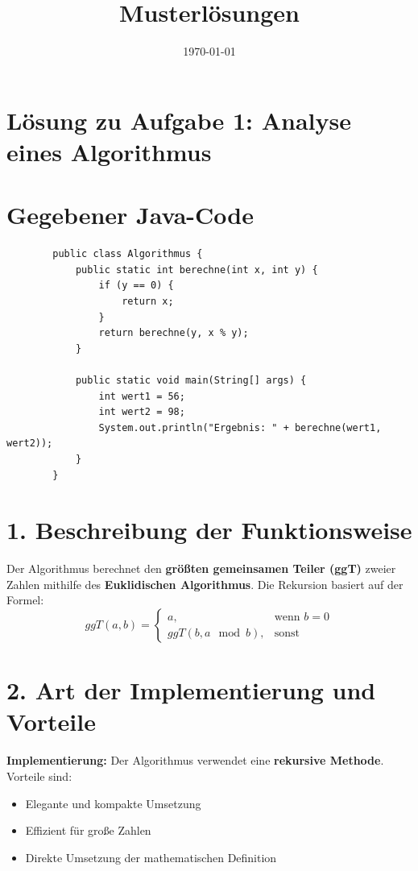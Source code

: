 \documentclass[a4paper,12pt]{article}
\begin{document}
	
	\title{\textbf{Musterlösungen}}
	\date{\today}
	\maketitle
	
	\section*{Lösung zu Aufgabe 1: Analyse eines Algorithmus}
	\section*{Gegebener Java-Code}
	
	\begin{verbatim}
		public class Algorithmus {
			public static int berechne(int x, int y) {
				if (y == 0) {
					return x;
				}
				return berechne(y, x % y);
			}
			
			public static void main(String[] args) {
				int wert1 = 56;
				int wert2 = 98;
				System.out.println("Ergebnis: " + berechne(wert1, wert2));
			}
		}
	\end{verbatim}
	
	\section*{1. Beschreibung der Funktionsweise}
	
	Der Algorithmus berechnet den \textbf{größten gemeinsamen Teiler (ggT)} zweier Zahlen mithilfe des \textbf{Euklidischen Algorithmus}. Die Rekursion basiert auf der Formel:
	\[ ggT(a, b) = \begin{cases} a, & \text{wenn } b = 0 \\ ggT(b, a\mod b), & \text{sonst} \end{cases} \]
	
	\section*{2. Art der Implementierung und Vorteile}
	
	\textbf{Implementierung:} Der Algorithmus verwendet eine \textbf{rekursive Methode}. Vorteile sind:
	\begin{itemize}
		\item Elegante und kompakte Umsetzung
		\item Effizient für große Zahlen
		\item Direkte Umsetzung der mathematischen Definition
	\end{itemize}
	
\end{document}
